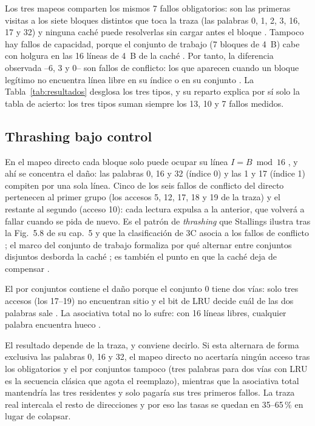 \documentclass[llncs]{llncs}
\begin{document}
Los tres mapeos comparten los mismos 7 fallos obligatorios: son las
primeras visitas a los siete bloques distintos que toca la traza (las
palabras 0, 1, 2, 3, 16, 17 y 32) y ninguna caché puede resolverlas sin
cargar antes el bloque \cite{wikipedia-metrics,wikipedia-cache}. Tampoco
hay fallos de capacidad, porque el conjunto de trabajo (7 bloques de
4~B) cabe con holgura en las 16 líneas de 4~B de la caché
\cite{wikipedia-metrics,denning1968}. Por tanto, la diferencia observada
--6, 3 y 0-- son fallos de conflicto: los que aparecen cuando un bloque
legítimo no encuentra línea libre en su índice o en su conjunto
\cite{wikipedia-metrics,stallings2019}. La Tabla~\ref{tab:resultados}
desglosa los tres tipos, y su reparto explica por sí solo la tabla de
acierto: los tres tipos suman siempre los 13, 10 y 7 fallos medidos.

\subsection{Thrashing bajo control}

En el mapeo directo cada bloque solo puede ocupar su línea
$I = B \bmod 16$ \cite{stallings2019,wikipedia-cpu-cache}, y ahí se
concentra el daño: las palabras 0, 16 y 32 (índice 0) y las 1 y 17
(índice 1) compiten por una sola línea. Cinco de los seis fallos de
conflicto del directo pertenecen al primer grupo (los accesos 5, 12,
17, 18 y 19 de la traza) y el restante al segundo (acceso 10): cada
lectura expulsa a la anterior, que volverá a fallar cuando se pida de
nuevo. Es el patrón de \emph{thrashing} que Stallings ilustra tras la
Fig.~5.8 de su cap.~5 \cite{stallings2019} y que la clasificación de 3C
asocia a los fallos de conflicto \cite{wikipedia-metrics}; el marco del
conjunto de trabajo formaliza por qué alternar entre conjuntos disjuntos
desborda la caché \cite{denning1968,denning1972}; es también el
punto en que la caché deja de compensar \cite{null2024}.

El por conjuntos contiene el daño porque el conjunto 0 tiene dos vías:
solo tres accesos (los 17--19) no encuentran sitio y el bit de LRU
decide cuál de las dos palabras sale \cite{wikipedia-cpu-cache,hennessy2019}.
La asociativa total no lo sufre: con 16 líneas libres, cualquier palabra
encuentra hueco \cite{stallings2019}.

El resultado depende de la traza, y conviene decirlo. Si esta
alternara de forma exclusiva las palabras 0, 16 y 32, el mapeo directo
no acertaría ningún acceso tras los obligatorios y el por conjuntos
tampoco (tres palabras para dos vías con LRU es la secuencia clásica
que agota el reemplazo), mientras que la asociativa total mantendría las
tres residentes y solo pagaría sus tres primeros fallos. La traza real
intercala el resto de direcciones y por eso las tasas se quedan en
35--65\,\% en lugar de colapsar.
\end{document}
